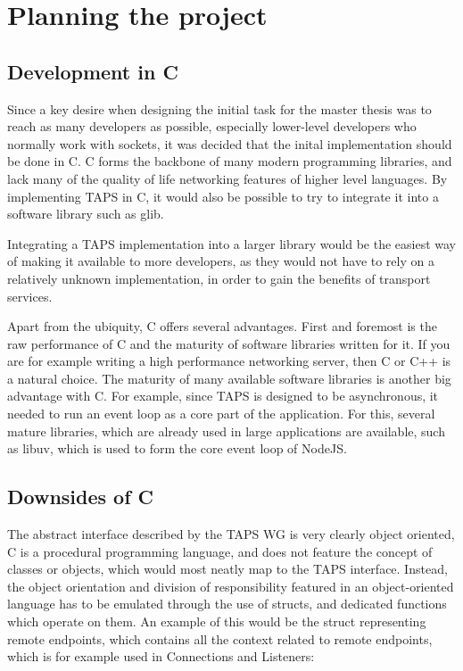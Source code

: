 

\chapter{Planning the project} \label{planningTheProject}
\section{Development in C}
Since a key desire when designing the initial task for
the master thesis was to reach as many developers as possible,
especially lower-level developers who normally work with sockets,
it was decided that the inital implementation should be done in C.
C forms the backbone of many modern programming libraries, and lack
many of the quality of life networking features of higher level languages.
By implementing TAPS in C, it would also be possible to try to integrate it
into a software library such as glib. 

Integrating a TAPS implementation into a larger library would be the easiest
way of making it available to more developers, as they would not have to
rely on a relatively unknown implementation, in order to gain the benefits
of transport services.

Apart from the ubiquity, C offers several advantages. First and foremost
is the raw performance of C and the maturity of software libraries written
for it. If you are for example writing a high performance networking server,
then C or C++ is a natural choice. The maturity of many available software libraries is
another big advantage with C. For example, since TAPS is designed to be asynchronous,
it needed to run an event loop as a core part of the application. For this,
several mature libraries, which are already used in large applications are
available, such as libuv, which is used to form the core event loop of NodeJS. \cite{Libuv2025}

\section{Downsides of C}
The abstract interface described by the TAPS WG is very clearly object
oriented, C is a procedural programming language, and does not feature
the concept of classes or objects, which would most neatly map to the
TAPS interface. Instead, the object orientation and division of responsibility
featured in an object-oriented language has to be emulated through the use of
structs, and dedicated functions which operate on them. An example of this
would be the struct representing remote endpoints, which contains all the
context related to remote endpoints, which is for example used
in Connections and Listeners:

